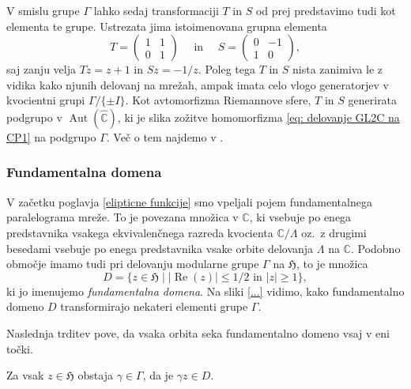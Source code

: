 \documentclass[mat1]{fmfdelo}
\numberwithin{equation}{section}
\newcommand{\C}{\mathbb C}
\newcommand{\HH}{\mathfrak{H}}
\newcommand{\RS}{\widehat{\C}}
\newcommand{\torus}{\C/\Lambda}
\newcommand{\SL}{\Gamma}
\newcommand{\abs}[1]{\left\lvert #1 \right\rvert}
\renewcommand\Re{\operatorname{Re}}%
\newcommand{\oz}{oz.\ }
\DeclareMathOperator{\Aut}{Aut}
\theoremstyle{definition}
\begin{document}
V smislu grupe $\SL$ lahko sedaj transformaciji $T$ in $S$ od prej predstavimo tudi kot elementa te grupe. Ustrezata jima istoimenovana grupna elementa
\[
    T = \begin{pmatrix}1 & 1 \\ 0 & 1\end{pmatrix} \quad \text{ in } \quad
    S = \begin{pmatrix}0 & -1 \\ 1 & 0\end{pmatrix},
\]
saj zanju velja $Tz = z + 1$ in $Sz = -1/z$. Poleg tega $T$ in $S$ nista zanimiva le z vidika kako njunih delovanj na mrežah, ampak imata celo vlogo generatorjev v kvocientni grupi $\SL/\{\pm I\}$. Kot avtomorfizma Riemannove sfere, $T$ in $S$ generirata podgrupo v $\Aut(\RS)$, ki je slika zožitve homomorfizma \eqref{eq: delovanje GL2C na CP1} na podgrupo $\SL$. Več o tem najdemo v \cite[VII, \S 1.]{Serre}.

\subsubsection*{Fundamentalna domena}

V začetku poglavja \ref{elipticne funkcije} smo vpeljali pojem fundamentalnega paralelograma mreže. To je povezana množica v $\C$, ki vsebuje po enega predstavnika vsakega ekvivalenčnega razreda kvocienta $\torus$ \oz z drugimi besedami vsebuje po enega predstavnika vsake orbite delovanja $\Lambda$ na $\C$. Podobno območje imamo tudi pri delovanju modularne grupe $\SL$ na $\HH$, to je množica 
\[
    D = \{z \in \HH \mid \abs{\Re(z)} \leq 1/2 \text{ in } \abs{z} \geq 1\},
\]
ki jo imenujemo \emph{fundamentalna domena}. Na sliki \ref{...} vidimo, kako fundamentalno domeno $D$ transformirajo nekateri elementi grupe $\SL$.

Naslednja trditev pove, da vsaka orbita seka fundamentalno domeno vsaj v eni točki.

\begin{trditev}
    \label{predstavnik fundamentalne domene}
    Za vsak $z \in \HH$ obstaja $\gamma \in \SL$, da je $\gamma z \in D$.
\end{trditev}
\end{document}
